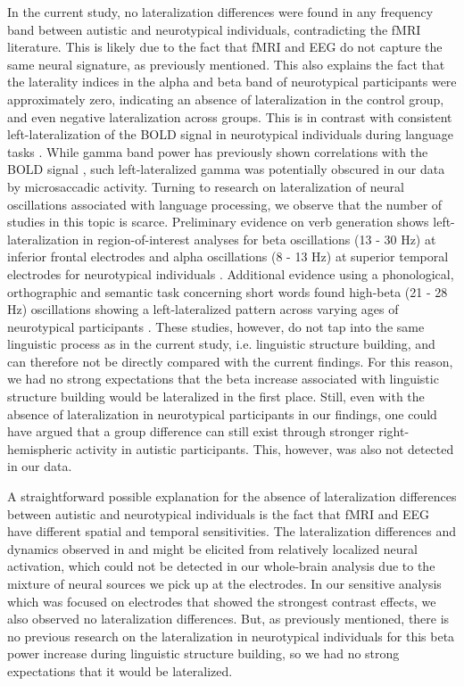 In the current study, no lateralization differences were found in any frequency band between autistic and neurotypical individuals, contradicting the fMRI literature. This is likely due to the fact that fMRI and EEG do not capture the same neural signature, as previously mentioned. This also explains the fact that the laterality indices in the alpha and beta band of neurotypical participants were approximately zero, indicating an absence of lateralization in the control group, and even negative lateralization across groups. This is in contrast with consistent left-lateralization of the BOLD signal in neurotypical individuals during language tasks \citep{fedorenko2010,pallier2011}. While gamma band power has previously shown correlations with the BOLD signal \citep{scheeringa2016}, such left-lateralized gamma was potentially obscured in our data by microsaccadic activity. Turning to research on lateralization of neural oscillations associated with language processing, we observe that the number of studies in this topic is scarce. Preliminary evidence on verb generation shows left-lateralization in region-of-interest analyses for beta oscillations (13 - 30 Hz) at inferior frontal electrodes and alpha oscillations (8 - 13 Hz) at superior temporal electrodes for neurotypical individuals \citep{nix2024}. Additional evidence using a phonological, orthographic and semantic task concerning short words found high-beta (21 - 28 Hz) oscillations showing a left-lateralized pattern across varying ages of neurotypical participants \citep{spironelli2010}. These studies, however, do not tap into the same linguistic process as in the current study, i.e. linguistic structure building, and can therefore not be directly compared with the current findings. For this reason, we had no strong expectations that the beta increase associated with linguistic structure building would be lateralized in the first place. Still, even with the absence of lateralization in neurotypical participants in our findings, one could have argued that a group difference can still exist through stronger right-hemispheric activity in autistic participants. This, however, was also not detected in our data. 

A straightforward possible explanation for the absence of lateralization differences between autistic and neurotypical individuals is the fact that fMRI and EEG have different spatial and temporal sensitivities. The lateralization differences and dynamics observed in \cite{jouravlev2020} and \cite{fedorenko2016} might be elicited from relatively localized neural activation, which could not be detected in our whole-brain analysis due to the mixture of neural sources we pick up at the electrodes. In our sensitive analysis which was focused on electrodes that showed the strongest contrast effects, we also observed no lateralization differences. But, as previously mentioned, there is no previous research on the lateralization in neurotypical individuals for this beta power increase during linguistic structure building, so we had no strong expectations that it would be lateralized. 

